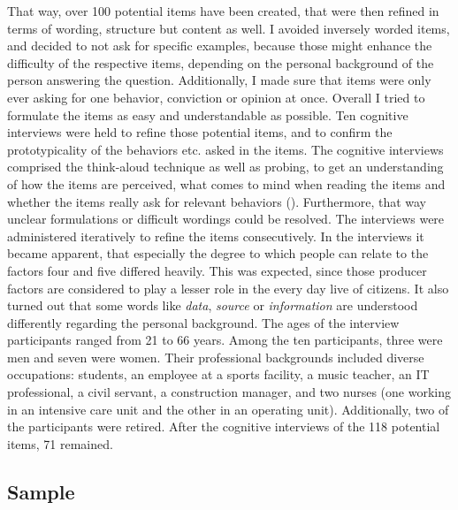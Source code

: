 \documentclass[
  12pt,
  a4paper,
  twoside]{article}
\begin{document}
That way, over 100 potential items have been created, that were then refined in terms of wording, structure but content as well.
I avoided inversely worded items, and decided to not ask for specific examples, because those might enhance the difficulty of the respective items, depending on the personal background of the person answering the question.
Additionally, I made sure that items were only ever asking for one behavior, conviction or opinion at once.
Overall I tried to formulate the items as easy and understandable as possible.
Ten cognitive interviews were held to refine those potential items, and to confirm the prototypicality of the behaviors etc. asked in the items.
The cognitive interviews comprised the think-aloud technique as well as probing, to get an understanding of how the items are perceived, what comes to mind when reading the items and whether the items really ask for relevant behaviors (). Furthermore, that way unclear formulations or difficult wordings could be resolved.
The interviews were administered iteratively to refine the items consecutively.
In the interviews it became apparent, that especially the degree to which people can relate to the factors four and five differed heavily. This was expected, since those producer factors are considered to play a lesser role in the every day live of citizens. It also turned out that some words like \emph{data}, \emph{source} or \emph{information} are understood differently regarding the personal background.
The ages of the interview participants ranged from 21 to 66 years. Among the ten participants, three were men and seven were women. Their professional backgrounds included diverse occupations: students, an employee at a sports facility, a music teacher, an IT professional, a civil servant, a construction manager, and two nurses (one working in an intensive care unit and the other in an operating unit). Additionally, two of the participants were retired.
After the cognitive interviews of the 118 potential items, 71 remained.

\subsection{Sample}\label{sample}
\end{document}
